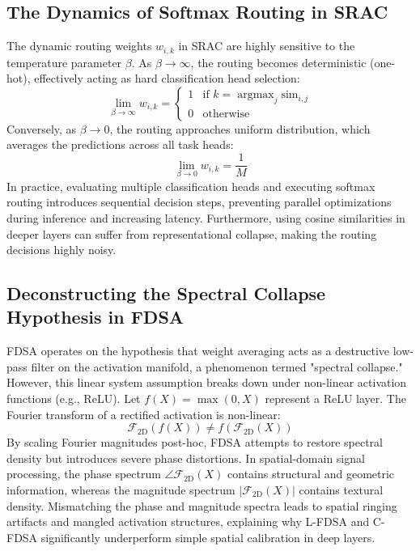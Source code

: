 \documentclass{article}
\theoremstyle{plain}
\theoremstyle{definition}
\theoremstyle{remark}
\begin{document}
\subsection{The Dynamics of Softmax Routing in SRAC}
The dynamic routing weights $w_{i, k}$ in SRAC are highly sensitive to the temperature parameter $\beta$. As $\beta \to \infty$, the routing becomes deterministic (one-hot), effectively acting as hard classification head selection:
\begin{equation}
    \lim_{\beta \to \infty} w_{i, k} = \begin{cases} 
      1 & \text{if } k = \operatorname{argmax}_j \text{sim}_{i, j} \\
      0 & \text{otherwise}
   \end{cases}
\end{equation}
Conversely, as $\beta \to 0$, the routing approaches uniform distribution, which averages the predictions across all task heads:
\begin{equation}
    \lim_{\beta \to 0} w_{i, k} = \frac{1}{M}
\end{equation}
In practice, evaluating multiple classification heads and executing softmax routing introduces sequential decision steps, preventing parallel optimizations during inference and increasing latency. Furthermore, using cosine similarities in deeper layers can suffer from representational collapse, making the routing decisions highly noisy.

\subsection{Deconstructing the Spectral Collapse Hypothesis in FDSA}
FDSA operates on the hypothesis that weight averaging acts as a destructive low-pass filter on the activation manifold, a phenomenon termed "spectral collapse." However, this linear system assumption breaks down under non-linear activation functions (e.g., ReLU). 
Let $f(X) = \max(0, X)$ represent a ReLU layer. The Fourier transform of a rectified activation is non-linear:
\begin{equation}
    \mathcal{F}_{\text{2D}}(f(X)) \ne f(\mathcal{F}_{\text{2D}}(X))
\end{equation}
By scaling Fourier magnitudes post-hoc, FDSA attempts to restore spectral density but introduces severe phase distortions. In spatial-domain signal processing, the phase spectrum $\angle \mathcal{F}_{\text{2D}}(X)$ contains structural and geometric information, whereas the magnitude spectrum $|\mathcal{F}_{\text{2D}}(X)|$ contains textural density. Mismatching the phase and magnitude spectra leads to spatial ringing artifacts and mangled activation structures, explaining why L-FDSA and C-FDSA significantly underperform simple spatial calibration in deep layers.
\end{document}
